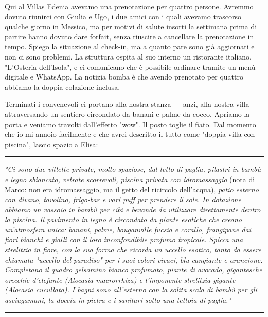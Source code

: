 Qui al Villas Edenia avevamo una prenotazione per quattro persone. Avremmo dovuto riunirci con Giulia e Ugo, i due amici con i quali avevamo trascorso qualche giorno in Messico, ma per motivi di salute insorti la settimana prima di partire hanno dovuto dare forfait, senza riuscire a cancellare la prenotazione in tempo. Spiego la situazione al check-in, ma a quanto pare sono già aggiornati e non ci sono problemi. La struttura ospita al suo interno un ristorante italiano, "L'Osteria dell'Isola", e ci comunicano che è possibile ordinare tramite un menù digitale e WhatsApp. La notizia bomba è che avendo prenotato per quattro abbiamo la doppia colazione inclusa.

Terminati i convenevoli ci portano alla nostra stanza — anzi, alla nostra villa — attraversando un sentiero circondato da banani e palme da cocco. Apriamo la porta e veniamo travolti dall'effetto "wow". Il posto toglie il fiato. Dal momento che io mi annoio facilmente e che avrei descritto il tutto come "doppia villa con piscina", lascio spazio a Elisa:

\begin{center}
    \noindent\rule{0.6\textwidth}{0.4pt}
\end{center}

\textit{"Ci sono due villette private, molto spaziose, dal tetto di paglia, pilastri in bambù e legno sbiancato, vetrate scorrevoli, piscina privata con idromassaggio} (nota di Marco: non era idromassaggio, ma il getto del ricircolo dell'acqua), \textit{patio esterno con divano, tavolino, frigo-bar e vari puff per prendere il sole. In dotazione abbiamo un vassoio in bambù per cibi e bevande da utilizzare direttamente dentro la piscina. Il pavimento in legno è circondato da piante esotiche che creano un'atmosfera unica: banani, palme, bouganville fucsia e corallo, frangipane dai fiori bianchi e gialli con il loro inconfondibile profumo tropicale. Spicca una strelitzia in fiore, con la sua forma che ricorda un uccello esotico, tanto da essere chiamata "uccello del paradiso" per i suoi colori vivaci, blu cangiante e arancione. Completano il quadro gelsomino bianco profumato, piante di avocado, gigantesche orecchie d'elefante (Alocasia macrorrhiza) e l'imponente strelitzia gigante (Alocasia cucullata). I bagni sono all'esterno con la solita scala di bambù per gli asciugamani, la doccia in pietra e i sanitari sotto una tettoia di paglia."}

\begin{center}
    \noindent\rule{0.6\textwidth}{0.4pt}
\end{center}

